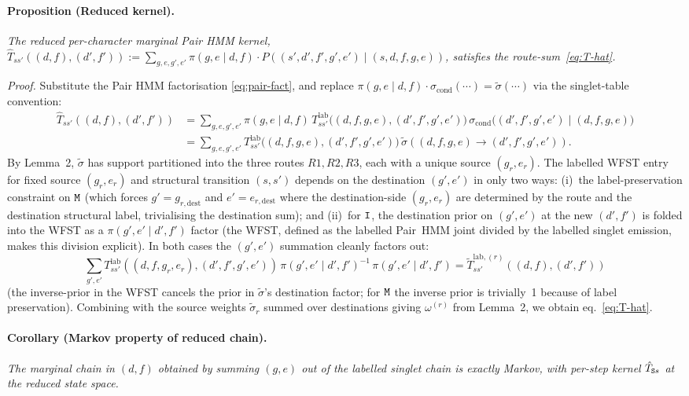 \paragraph{Proposition (Reduced kernel).}
\emph{The reduced per-character marginal Pair HMM kernel,
$\hat T_{ss'}((d, f), (d', f')) := \sum_{g, e, g', e'} \pi(g, e \mid d, f)
\cdot P((s', d', f', g', e') \mid (s, d, f, g, e))$,
satisfies the route-sum~\eqref{eq:T-hat}.}

\emph{Proof.} Substitute the Pair HMM factorisation
\eqref{eq:pair-fact}, and replace
$\pi(g, e \mid d, f) \cdot \sigma_{\text{cond}}(\cdots)
= \widetilde\sigma(\cdots)$ via the singlet-table convention:
\begin{align*}
\hat T_{ss'}((d, f), (d', f'))
&= \sum_{g, e, g', e'} \pi(g, e \mid d, f)\,
   T^{\text{lab}}_{ss'}\!\big((d, f, g, e), (d', f', g', e')\big)\,
   \sigma_{\text{cond}}\!\big((d', f', g', e') \mid (d, f, g, e)\big) \\
&= \sum_{g, e, g', e'}
   T^{\text{lab}}_{ss'}\!\big((d, f, g, e), (d', f', g', e')\big)\,
   \widetilde\sigma((d, f, g, e) \to (d', f', g', e')).
\end{align*}
By Lemma~2, $\widetilde\sigma$ has support partitioned into the
three routes $R1, R2, R3$, each with a unique source $(g_r, e_r)$.
The labelled WFST entry for fixed source $(g_r, e_r)$ and
structural transition $(s, s')$ depends on the destination
$(g', e')$ in only two ways: (i)~the label-preservation constraint
on ${\tt M}$ (which forces $g' = g_{r,\text{dest}}$ and $e' = e_{r,\text{dest}}$
where the destination-side $(g_r, e_r)$ are determined by the route
and the destination structural label, trivialising the destination
sum); and (ii)~for ${\tt I}$, the destination prior on $(g', e')$ at
the new $(d', f')$ is folded into the WFST as a $\pi(g', e' \mid d',
f')$ factor (the WFST, defined as the labelled Pair~HMM joint divided
by the labelled singlet emission, makes this division explicit). In both
cases the $(g', e')$ summation cleanly factors out:
\[
\sum_{g', e'} T^{\text{lab}}_{ss'}((d, f, g_r, e_r),
(d', f', g', e'))\,\pi(g', e' \mid d', f')^{-1}\,\pi(g', e' \mid d',
f') = \tilde T^{\text{lab}, (r)}_{ss'}((d, f), (d', f'))
\]
(the inverse-prior in the WFST cancels the prior in
$\widetilde\sigma$'s destination factor; for ${\tt M}$ the inverse
prior is trivially~1 because of label preservation). Combining
with the source weights $\widetilde\sigma_r$ summed over destinations
giving $\omega^{(r)}$ from Lemma~2, we obtain eq.~\eqref{eq:T-hat}.
\qedhere

\paragraph{Corollary (Markov property of reduced chain).}
\emph{The marginal chain in $(d, f)$ obtained by summing $(g, e)$
out of the labelled singlet chain is exactly Markov, with
per-step kernel $\hat T_{{\tt S} s}$ at the reduced state space.}

